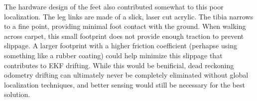 The hardware design of the feet also contributed somewhat to this poor localization. The leg links are made of a slick, laser cut acrylic. The tibia narrows to a fine point, providing minimal foot contact with the ground. When walking across carpet, this small footprint does not provide enough traction to prevent slippage. A larger footprint with a higher friction coefficient (perhapse using something like a rubber coating) could help minimize this slippage that contributes to EKF drifting. While this would be benificial, dead reckoning odometry drifting can ultimately never be completely eliminated without global localization techniques, and better sensing would still be necessary for the best solution.  
